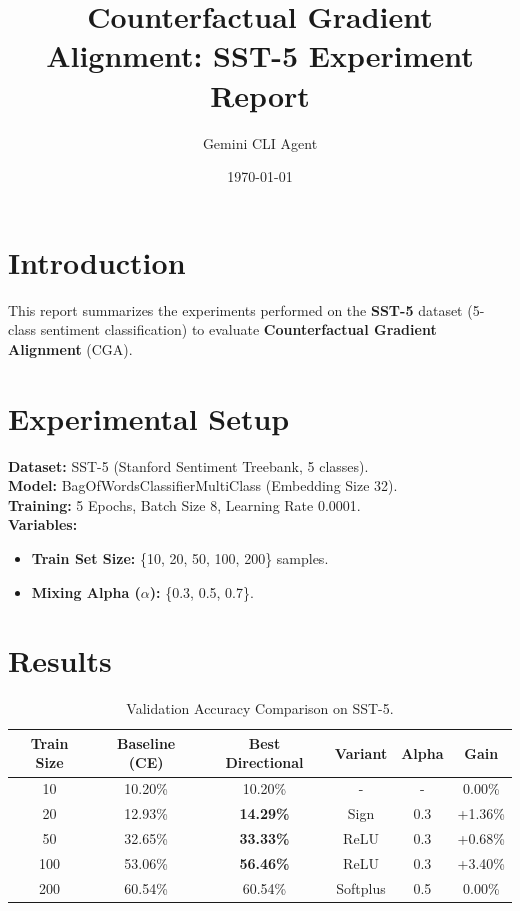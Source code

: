\documentclass{article}
\title{Counterfactual Gradient Alignment: SST-5 Experiment Report}
\author{Gemini CLI Agent}
\date{\today}
\begin{document}
\maketitle

\section{Introduction}
This report summarizes the experiments performed on the \textbf{SST-5} dataset (5-class sentiment classification) to evaluate \textbf{Counterfactual Gradient Alignment} (CGA).

\section{Experimental Setup}
\textbf{Dataset:} SST-5 (Stanford Sentiment Treebank, 5 classes). \\
\textbf{Model:} BagOfWordsClassifierMultiClass (Embedding Size 32). \\
\textbf{Training:} 5 Epochs, Batch Size 8, Learning Rate 0.0001. \\
\textbf{Variables:}
\begin{itemize}
    \item \textbf{Train Set Size:} \{10, 20, 50, 100, 200\} samples.
    \item \textbf{Mixing Alpha (\(\alpha\)):} \{0.3, 0.5, 0.7\}.
\end{itemize}

\section{Results}

\begin{table}[h]
\centering
\begin{tabular}{@{}cccccc@{}}
\toprule
\textbf{Train Size} & \textbf{Baseline (CE)} & \textbf{Best Directional} & \textbf{Variant} & \textbf{Alpha} & \textbf{Gain} \\
\midrule
10 & 10.20\% & 10.20\% & - & - & 0.00\% \\
20 & 12.93\% & \textbf{14.29\%} & Sign & 0.3 & +1.36\% \\
50 & 32.65\% & \textbf{33.33\%} & ReLU & 0.3 & +0.68\% \\
100 & 53.06\% & \textbf{56.46\%} & ReLU & 0.3 & +3.40\% \\
200 & 60.54\% & 60.54\% & Softplus & 0.5 & 0.00\% \\
\bottomrule
\end{tabular}
\caption{Validation Accuracy Comparison on SST-5.}
\label{tab:results}
\end{table}
\end{document}
